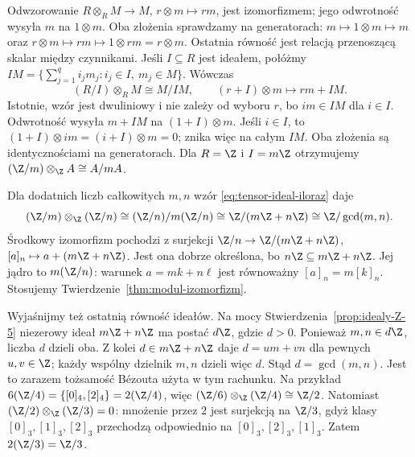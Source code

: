 \begin{przyklad}
\label{prz:tensor-jednostka-ideal}
Odwzorowanie $R\otimes_R M\to M$,
$r\otimes m\mapsto rm$, jest izomorfizmem;
jego odwrotność wysyła $m$ na $1\otimes m$.
Oba złożenia sprawdzamy na generatorach:
$m\mapsto1\otimes m\mapsto m$ oraz
$r\otimes m\mapsto rm\mapsto1\otimes rm=r\otimes m$.
Ostatnia równość jest relacją przenoszącą skalar między czynnikami.
Jeśli $I\subseteq R$ jest ideałem, połóżmy
$IM=\{\sum_{j=1}^q i_jm_j:
i_j\in I,\ m_j\in M\}$.
Wówczas
\begin{equation}\label{eq:tensor-ideal-iloraz}
 (R/I)\otimes_R M\cong M/IM,
 \qquad (r+I)\otimes m\longmapsto rm+IM.
\end{equation}
Istotnie, wzór jest dwuliniowy i nie zależy
od wyboru $r$, bo $i m\in IM$ dla $i\in I$.
Odwrotność wysyła $m+IM$ na
$(1+I)\otimes m$. Jeśli $i\in I$, to
$(1+I)\otimes im=(i+I)\otimes m=0$;
znika więc na całym $IM$. Oba złożenia
są identycznościami na generatorach.
Dla $R=\Z$ i $I=m\Z$ otrzymujemy
$(\Z/m)\otimes_{\Z}A\cong A/mA$.
\end{przyklad}

\begin{przyklad}
Dla dodatnich liczb całkowitych $m,n$ wzór
\eqref{eq:tensor-ideal-iloraz} daje
\[
 (\Z/m)\otimes_{\Z}(\Z/n)
 \cong (\Z/n)/m(\Z/n)
 \cong \Z/(m\Z+n\Z)
 \cong \Z/\gcd(m,n).
\]
Środkowy izomorfizm pochodzi z surjekcji
$\Z/n\to\Z/(m\Z+n\Z)$, $[a]_n\mapsto a+(m\Z+n\Z)$.
Jest ona dobrze określona, bo $n\Z\subseteq m\Z+n\Z$.
Jej jądro to $m(\Z/n)$: warunek $a=mk+n\ell$
jest równoważny $[a]_n=m[k]_n$.
Stosujemy Twierdzenie~\ref{thm:modul-izomorfizm}.

Wyjaśnijmy też ostatnią równość ideałów. Na mocy
Stwierdzenia~\ref{prop:idealy-Z-5} niezerowy ideał
$m\Z+n\Z$ ma postać $d\Z$, gdzie $d>0$.
Ponieważ $m,n\in d\Z$, liczba $d$ dzieli oba.
Z kolei $d\in m\Z+n\Z$ daje $d=um+vn$
dla pewnych $u,v\in\Z$; każdy wspólny dzielnik $m,n$
dzieli więc $d$. Stąd $d=\gcd(m,n)$.
Jest to zarazem tożsamość Bézouta użyta w tym rachunku.
Na przykład $6(\Z/4)=\{[0]_4,[2]_4\}=2(\Z/4)$,
więc $(\Z/6)\otimes_{\Z}(\Z/4)\cong\Z/2$.
Natomiast $(\Z/2)\otimes_{\Z}(\Z/3)=0$:
mnożenie przez $2$ jest surjekcją na $\Z/3$,
gdyż klasy $[0]_3,[1]_3,[2]_3$ przechodzą odpowiednio
na $[0]_3,[2]_3,[1]_3$. Zatem $2(\Z/3)=\Z/3$.
\end{przyklad}


